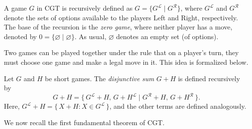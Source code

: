 \documentclass[oneside,reqno]{amsart}
\begin{document}

    A game $G$ in CGT is recursively defined as $G = \{G^{\mathscr{L}} \mid G^{\mathcal{R}}\}$, where $G^{\mathcal{L}}$ and $G^{\mathcal{R}}$ denote the sets of options available to the players Left and Right, respectively.  
    The base of the recursion is the \emph{zero game}, where neither player has a move, denoted by $0 = \{\varnothing \mid \varnothing\}$. As usual, $\varnothing$ denotes an empty set (of options).
    
    Two games can be played together under the rule that on a player’s turn, they must choose one game and make a legal move in it. This idea is formalized below.

    \begin{definition}\label{def: disjunctive sum}
        Let $G$ and $H$ be short games. The \emph{disjunctive sum} $G + H$ is defined recursively by
        $$G + H = \{\, G^{\mathcal{L}} + H,\, G + H^{\mathcal{L}} \mid G^{\mathcal{R}} + H,\, G + H^{\mathcal{R}} \,\}.$$
        Here, $G^{\mathcal{L}} + H = \{\, X + H : X \in G^{\mathcal{L}} \,\}$, and the other terms are defined analogously.
    \end{definition}
    We now recall the first fundamental theorem of CGT.
\end{document}

